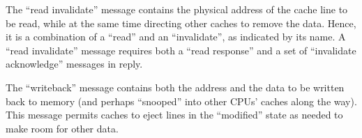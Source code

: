 \begin{description}[style=nextline]
\item	[Read Invalidate:]
	The ``read invalidate'' message contains the physical address
	of the cache line to be read, while at the same time directing
	other caches to remove the data.
	Hence, it is a combination of a ``read'' and an ``invalidate'',
	as indicated by its name.
	A ``read invalidate'' message requires both a ``read response''
	and a set of ``invalidate acknowledge'' messages in reply.
\item	[Writeback:]
	The ``writeback'' message contains both the address and the
	data to be written back to memory (and perhaps ``snooped''
	into other CPUs' caches along the way).
	This message permits caches to eject lines in the ``modified''
	state as needed to make room for other data.
\fi
\end{description}

